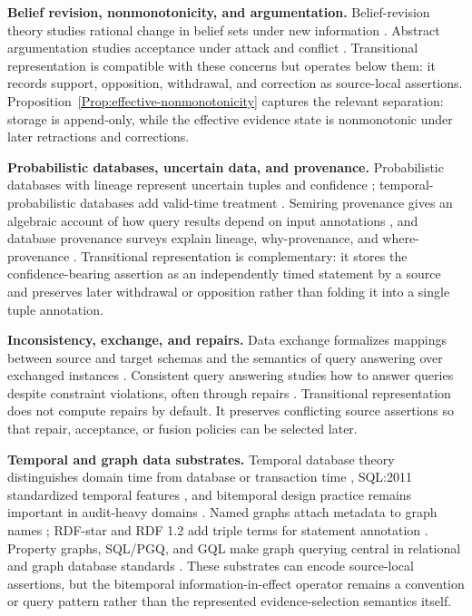 \documentclass[a4paper,fleqn]{cas-sc}
\theoremstyle{plain}
\theoremstyle{remark}
\begin{document}
\textbf{Belief revision, nonmonotonicity, and argumentation.}
Belief-revision theory studies rational change in belief sets under new information \cite{AGM1985}. Abstract argumentation studies acceptance under attack and conflict \cite{Dung1995}. Transitional representation is compatible with these concerns but operates below them: it records support, opposition, withdrawal, and correction as source-local assertions. Proposition~\ref{Prop:effective-nonmonotonicity} captures the relevant separation: storage is append-only, while the effective evidence state is nonmonotonic under later retractions and corrections.

\textbf{Probabilistic databases, uncertain data, and provenance.}
Probabilistic databases with lineage represent uncertain tuples and confidence \cite{BenjellounEtAl}; temporal-probabilistic databases add valid-time treatment \cite{DyllaEtAl}. Semiring provenance gives an algebraic account of how query results depend on input annotations \cite{GreenEtAl}, and database provenance surveys explain lineage, why-provenance, and where-provenance \cite{CheneyEtAl}. Transitional representation is complementary: it stores the confidence-bearing assertion as an independently timed statement by a source and preserves later withdrawal or opposition rather than folding it into a single tuple annotation.

\textbf{Inconsistency, exchange, and repairs.}
Data exchange formalizes mappings between source and target schemas and the semantics of query answering over exchanged instances \cite{FaginEtAl}. Consistent query answering studies how to answer queries despite constraint violations, often through repairs \cite{ArenasEtAl}. Transitional representation does not compute repairs by default. It preserves conflicting source assertions so that repair, acceptance, or fusion policies can be selected later.

\textbf{Temporal and graph data substrates.}
Temporal database theory distinguishes domain time from database or transaction time \cite{Snodgrass}, SQL:2011 standardized temporal features \cite{SQL2011}, and bitemporal design practice remains important in audit-heavy domains \cite{Johnston}. Named graphs attach metadata to graph names \cite{CarrollEtAl}; RDF-star and RDF 1.2 add triple terms for statement annotation \cite{HartigChampin,RDF12}. Property graphs, SQL/PGQ, and GQL make graph querying central in relational and graph database standards \cite{FrancisEtAl,SQLPGQ,GQL,DeutschEtAl2021,GheerbrantEtAl2024}. These substrates can encode source-local assertions, but the bitemporal information-in-effect operator remains a convention or query pattern rather than the represented evidence-selection semantics itself.
\end{document}
